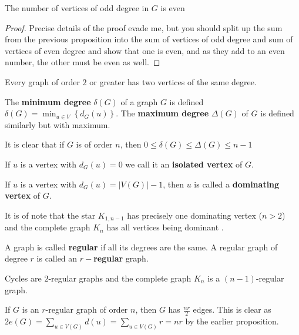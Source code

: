 \begin{corollary}
	The number of vertices of odd degree in $G$ is even
\end{corollary}
\begin{proof}
	Precise details of the proof evade me, but you should split up the sum from the previous proposition into the sum of vertices of odd degree and sum of vertices of even degree and show that one is even, and as they add to an even number, the other must be even as well.
\end{proof}
\begin{proposition}
	Every graph of order $2$ or greater has two vertices of the same degree.
\end{proposition}

\begin{definition}
	The \textbf{minimum degree} $\delta \left( G \right) $ of a graph $G$ is defined $\delta\left( G \right) = \min _{u \in V}\left\{ d_{G}\left( u \right)  \right\} $. The  \textbf{maximum degree} $\Delta \left( G \right) $ of $G$ is defined similarly but with maximum.
\end{definition}
\begin{remark}
	It is clear that if $G$ is of order $n$, then $0 \le \delta\left( G \right) \le \Delta \left( G \right) \le n-1$
\end{remark}
\begin{definition}
	If $u$ is a vertex with $d_{G}\left( u \right)  = 0$ we call it an \textbf{isolated vertex} of $G$.
\end{definition}
\begin{definition}
	If $u$ is a vertex with $d_{G} \left( u \right) = \left|  V\left( G \right)  \right| - 1$, then $u$ is called a \textbf{dominating vertex} of $G$.
\end{definition}
\begin{remark}
	It is of note that the star $K_{1,n-1}$ has precisely one dominating vertex  ($n >2 $) and the complete graph $K_{n}$ has all vertices being dominant	.
\end{remark}
\begin{definition}
A graph is called \textbf{regular} if all its degrees are the same. A regular graph of degree $r$ is called an \textbf{$r-$regular} graph.
\end{definition}
 \begin{example}
	 Cycles are $2$-regular graphs and the complete graph $K_{n}$ is a $\left( n-1 \right) $-regular graph.
\end{example} \newline
\begin{remark}
	If $G$ is an $r$-regular graph of order $n$, then $G$ has $\frac{nr}{2}$ edges. This is clear as $2e\left( G \right) = \sum_{u \in V\left( G \right) }^{} d\left( u \right) = \sum_{u \in V\left( G \right) }^{} r = nr$ by the earlier proposition.
\end{remark}
